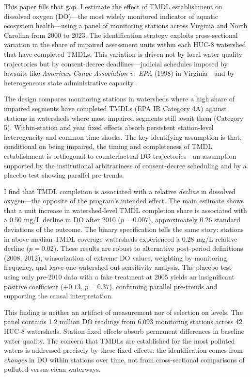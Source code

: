\documentclass[12pt]{article}
\begin{document}
This paper fills that gap. I estimate the effect of TMDL establishment on dissolved oxygen (DO)---the most widely monitored indicator of aquatic ecosystem health---using a panel of monitoring stations across Virginia and North Carolina from 2000 to 2023. The identification strategy exploits cross-sectional variation in the share of impaired assessment units within each HUC-8 watershed that have completed TMDLs. This variation is driven not by local water quality trajectories but by consent-decree deadlines---judicial schedules imposed by lawsuits like \textit{American Canoe Association v.\ EPA} (1998) in Virginia---and by heterogeneous state administrative capacity \citep{herd2018}.

The design compares monitoring stations in watersheds where a high share of impaired segments have completed TMDLs (EPA IR Category 4A) against stations in watersheds where most impaired segments still await them (Category 5). Within-station and year fixed effects absorb persistent station-level heterogeneity and common time shocks. The key identifying assumption is that, conditional on being impaired, the timing and completeness of TMDL establishment is orthogonal to counterfactual DO trajectories---an assumption supported by the institutional arbitrariness of consent-decree scheduling and by a placebo test showing parallel pre-trends.

I find that TMDL completion is associated with a relative \textit{decline} in dissolved oxygen---the opposite of the program's intended effect. The main estimate shows that a unit increase in watershed-level TMDL completion share is associated with a 0.50 mg/L decline in DO after 2010 ($p = 0.007$), approximately 0.26 standard deviations of the outcome. The binary specification tells the same story: stations in above-median TMDL coverage watersheds experienced a 0.28 mg/L relative decline ($p = 0.02$). These results are robust to alternative post-period definitions (2008, 2012), winsorization of extreme DO values, weighting by monitoring frequency, and leave-one-watershed-out sensitivity analysis. The placebo test using only pre-2010 data with a fake treatment at 2005 yields an insignificant positive coefficient ($+0.13$, $p = 0.37$), confirming parallel pre-trends and supporting the causal interpretation.

This finding is neither an artifact of measurement nor of selection on levels. The panel contains 1.2 million DO readings from 6,093 monitoring stations across 42 HUC-8 watersheds. Station fixed effects absorb permanent differences in baseline water quality. The concern that TMDLs are established for the most polluted waters is addressed precisely by these fixed effects: the identification comes from \textit{changes} in DO within stations over time, not from cross-sectional comparisons of polluted versus clean waterways.
\end{document}
